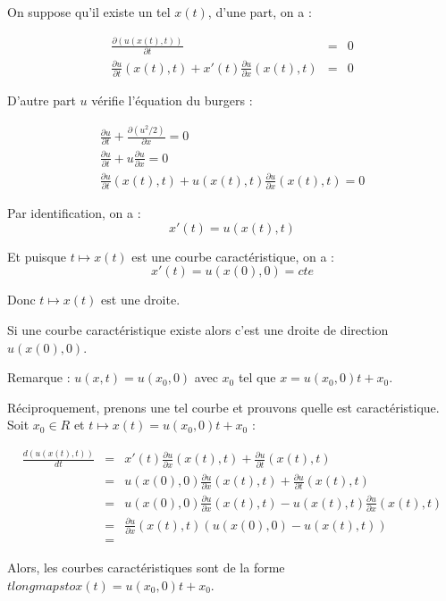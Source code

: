 \documentclass{article}
\begin{document}
On suppose qu'il existe un tel $x(t)$, d'une part, on a :

\begin{eqnarray*}
	\frac{\partial (u(x(t),t))}{\partial t} &=& 0 \\
	\frac{\partial u}{\partial t}(x(t),t) + x'(t) \frac{\partial u}{\partial x}(x(t),t) &=& 0
\end{eqnarray*}

D'autre part $u$ vérifie l'équation du burgers :

\begin{eqnarray*}
	\frac{\partial u}{\partial t} + \frac{\partial (u^2/2)}{\partial x} = 0 \\
	\frac{\partial u}{\partial t} + u \frac{\partial u}{\partial x} = 0 \\
	\frac{\partial u}{\partial t}(x(t),t) + u(x(t),t) \frac{\partial u}{\partial x}(x(t),t) = 0 
\end{eqnarray*}

Par identification, on a :
\[ x'(t) = u(x(t),t) \]

Et puisque $t \longmapsto x(t)$ est une courbe caractéristique, on a :
\[x'(t) = u(x(0),0) = cte\]

Donc $t \longmapsto x(t)$ est une droite.

Si une courbe caractéristique existe alors c'est une droite de direction $u(x(0),0)$.
\newline

Remarque : $u(x,t) = u(x_0,0)$ avec $x_0$ tel que $x = u(x_0,0) t + x_0$.
\newline

Réciproquement, prenons une tel courbe et prouvons quelle est caractéristique. Soit $x_0 \in R$ et $t \longmapsto x(t) = u(x_0,0) t + x_0$ :

\begin{eqnarray*}
	\frac{d (u(x(t),t))}{dt} &=& x'(t) \frac{\partial u}{\partial x}(x(t),t) + \frac{\partial u}{\partial t}(x(t),t) \\
	&=& u(x(0),0) \frac{\partial u}{\partial x}(x(t),t) + \frac{\partial u}{\partial t}(x(t),t) \\
	&=& u(x(0),0) \frac{\partial u}{\partial x}(x(t),t) - u(x(t),t) \frac{\partial u}{\partial x}(x(t),t) \\
	&=& \frac{\partial u}{\partial x}(x(t),t) \left( u(x(0),0)-u(x(t),t) \right) \\
	&=& 
\end{eqnarray*}

Alors, les courbes caractéristiques sont de la forme $t longmapsto x(t) = u(x_0,0) t + x_0$.
\end{document}
